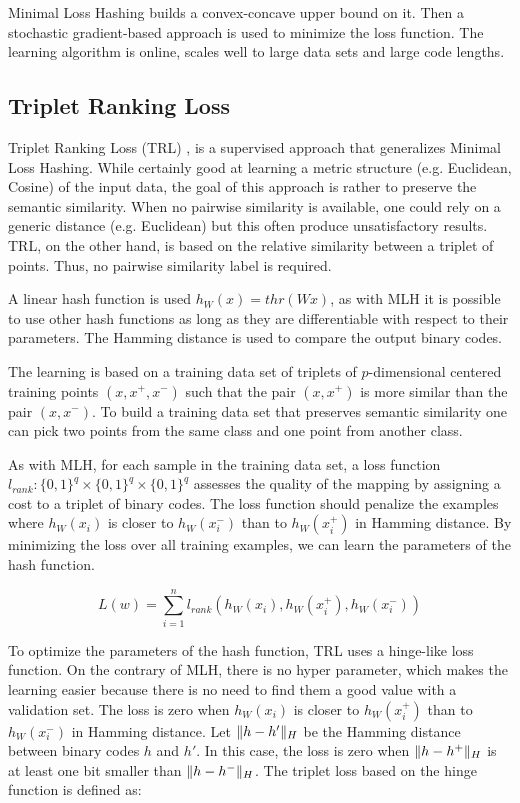 Minimal Loss Hashing builds a convex-concave upper bound on it. Then a stochastic gradient-based approach is used to minimize the loss function. The learning algorithm is online, scales well to large data sets and large code lengths.

\subsection{Triplet Ranking Loss}
Triplet Ranking Loss (TRL) \cite{norouzi2012hamming},\cite{norouzi2016} is a supervised approach that generalizes Minimal Loss Hashing. While certainly good at learning a metric structure (e.g. Euclidean, Cosine) of the input data, the goal of this approach is rather to preserve the semantic similarity. When no pairwise similarity is available, one could rely on a generic distance (e.g. Euclidean) but this often produce unsatisfactory results. TRL, on the other hand, is based on the relative similarity between a triplet of points. Thus, no pairwise similarity label is required.

A linear hash function is used $h_W(x)=thr(Wx)$, as with MLH it is possible to use other hash functions as long as they are differentiable with respect to their parameters. The Hamming distance is used to compare the output binary codes.

The learning is based on a training data set of triplets of $p$-dimensional centered training points $(x, x^{+}, x^{-})$ such that the pair $(x, x^{+})$ is more similar than the pair $(x, x^{-})$. To build a training data set that preserves semantic similarity one can pick two points from the same class and one point from another class.

As with MLH, for each sample in the training data set, a loss function $l_{rank}: \{0, 1\}^{q}\times\{0, 1\}^{q}\times\{0, 1\}^{q}$ assesses the quality of the mapping by assigning a cost to a triplet of binary codes. The loss function should penalize the examples where $h_W(x_i)$ is closer to $h_W(x^{-}_i)$ than to $h_W(x^{+}_i)$ in Hamming distance. By minimizing the loss over all training examples, we can learn the parameters of the hash function.

\[L(w)=\sum\limits_{i=1}^n l_{rank}(h_W(x_i), h_W(x^{+}_i), h_W(x^{-}_i))\]

To optimize the parameters of the hash function, TRL uses a hinge-like loss function. On the contrary of MLH, there is no hyper parameter, which makes the learning easier because there is no need to find them a good value with a validation set. The loss is zero when $h_W(x_i)$ is closer to $h_W(x^{+}_i)$ than to $h_W(x^{-}_i)$ in Hamming distance. Let $\lVert h - h'\rVert_{H}$ be the Hamming distance between binary codes $h$ and $h'$. In this case, the loss is zero when $\lVert h - h^{+}\rVert_{H}$ is at least one bit smaller than $\lVert h - h^{-}\rVert_{H}$. The triplet loss based on the hinge function is defined as:

